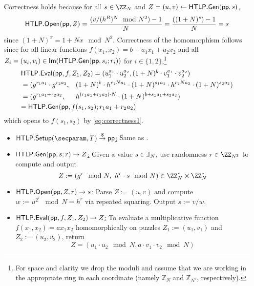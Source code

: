 \noindent Correctness holds because for all $s \in \ZZ_N$ and $Z = (u,v) \gets \mathsf{HTLP}.{\sf Gen}(\mathsf{pp}, s)$,
\begin{equation}\label{eq:correctness1}
\mathsf{HTLP}.\mathsf{Open}(\mathsf{pp}, Z) = \frac{(v/(h^R)^N \mod{N^2})-1}{N} = \frac{((1+N)^s) - 1}{N} = s
\end{equation}
since $(1+N)^x = 1+Nx \mod{N^2}$.
Correctness of the homomorphism follows since for all linear functions $f(x_1, x_2) = b + a_1 x_1 + a_2 x_2$ and all $Z_i = (u_i, v_i) \in {\sf Im}(\mathsf{HTLP}.{\sf Gen}(\mathsf{pp}, s_i; r_i))$ for $i \in \{1,2\}$,\footnote{For space and clarity we drop the moduli and assume that we are working in the appropriate ring in each coordinate (namely $\mathbb{Z}_N$ and $\mathbb{Z}_{N^2}$, respectively).}
\begin{align*}
&\htlp\rlap{$.{\sf Eval}(\pp, f, Z_1, Z_2) = (u_1^{a_1} \cdot u_2^{a_2}, (1+N)^b \cdot v_1^{a_1} \cdot v_2^{a_2})$} && \\
&= (g^{r_1 a_1} \cdot g^{r_2 a_2}, &&(1+N)^b \cdot h^{r_1 N a_1} \cdot (1+N)^{s_1 a_1} \cdot h^{r_2 N a_2} \cdot (1+N)^{s_2 a_2})\\
&= (g^{r_1 a_1 + r_2 a_2},         &&h^{(r_1 a_1 + r_2 a_2) \cdot N} \cdot (1+N)^{b + s_1 a_1 + s_2 a_2}) \\
&\rlap{$= \htlp.{\sf Gen}(\pp, f(s_1, s_2); r_1 a_1 + r_2 a_2)$} &&
\end{align*}
which opens to $f(s_1, s_2)$ by \cref{eq:correctness1}.


    \begin{construction}\label{con:multHTLP}
    \hfill
    \begin{itemize}
        \item \underline{$\htlp.\Setup(\secparam, \Ttime) \randout \pp$:} Same as .
        \item \underline{$\mathsf{HTLP}.{\sf Gen}(\mathsf{pp}, s; r) \rightarrow Z$:} Given a value $s \in \mathbb{J}_N$, use randomness $r \in \ZZ_{N^2}$ to compute and output
            $$Z := (g^r \mod{N},\ h^r \cdot s \mod{N}) \in \ZZ_N^* \times \ZZ_N^*$$
        \item \underline{$\mathsf{HTLP}.\mathsf{Open}(\mathsf{pp}, Z, r) \rightarrow s$:} Parse $Z := (u,v)$ and compute $w := u^{2^T} \mod{N} \allowbreak= h^r$ via repeated squaring. Output $s := v/w$.
        \item \underline{$\mathsf{HTLP}.{\sf Eval}(\mathsf{pp}, f, Z_1, Z_2) \rightarrow Z$:} To evaluate a multiplicative function $f(x_1, x_2) \allowbreak= a x_1 x_2$ homomorphically on puzzles $Z_1 := (u_1, v_1)$ and $Z_2 := (u_2, v_2)$, return
        $$Z = (u_1 \cdot u_2 \mod{N}, a \cdot v_1 \cdot v_2 \mod{N})$$
    \end{itemize}
    \end{construction}

